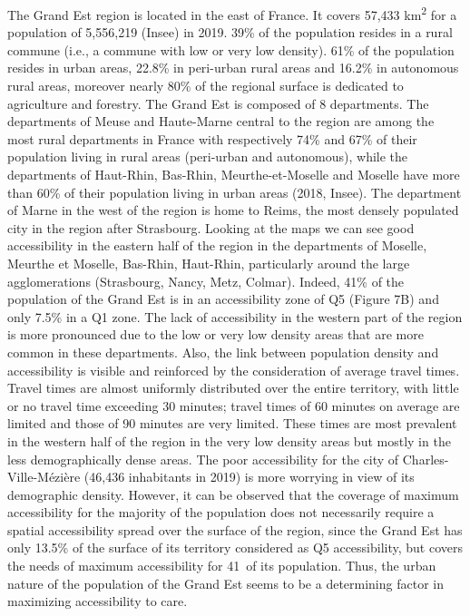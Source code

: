 The Grand Est region is located in the east of France. It covers 57,433 km\textsuperscript{2} for a population of 5,556,219 (Insee) in 2019. 39\% of the population resides in a rural commune (i.e., a commune with low or very low density). 61\% of the population resides in urban areas, 22.8\% in peri-urban rural areas and 16.2\% in autonomous rural areas, moreover nearly 80\% of the regional surface is dedicated to agriculture and forestry.
The Grand Est is composed of 8 departments. The departments of Meuse and Haute-Marne central to the region are among the most rural departments in France with respectively 74\% and 67\% of their population living in rural areas (peri-urban and autonomous), while the departments of Haut-Rhin, Bas-Rhin, Meurthe-et-Moselle and Moselle have more than 60\% of their population living in urban areas (2018, Insee). The department of Marne in the west of the region is home to Reims, the most densely populated city in the region after Strasbourg. Looking at the maps we can see good accessibility in the eastern half of the region in the departments of Moselle, Meurthe et Moselle, Bas-Rhin, Haut-Rhin, particularly around the large agglomerations (Strasbourg, Nancy, Metz, Colmar). Indeed, 41\% of the population of the Grand Est is in an accessibility zone of Q5 (Figure 7B) and only 7.5\% in a Q1 zone. The lack of accessibility in the western part of the region is more pronounced due to the low or very low density areas that are more common in these departments. Also, the link between population density and accessibility is visible and reinforced by the consideration of average travel times. Travel times are almost uniformly distributed over the entire territory, with little or no travel time exceeding 30 minutes; travel times of 60 minutes on average are limited and those of 90 minutes are very limited. These times are most prevalent in the western half of the region in the very low density areas but mostly in the less demographically dense areas.  The poor accessibility for the city of Charles-Ville-Mézière (46,436 inhabitants in 2019) is more worrying in view of its demographic density.
However, it can be observed that the coverage of maximum accessibility for the majority of the population does not necessarily require a spatial accessibility spread over the surface of the region, since the Grand Est has only 13.5\% of the surface of its territory considered as Q5 accessibility, but covers the needs of maximum accessibility for 41\ of its population. Thus, the urban nature of the population of the Grand Est seems to be a determining factor in maximizing accessibility to care.

